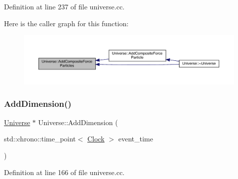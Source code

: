 Definition at line 237 of file universe.\+cc.

Here is the caller graph for this function\+:
\nopagebreak
\begin{figure}[H]
\begin{center}
\leavevmode
\includegraphics[width=350pt]{class_universe_a23d74e377203fca7cb74e0ffee7244b6_icgraph}
\end{center}
\end{figure}
\mbox{\label{class_universe_a6326158c47bf3f7fe9297299a9b5b7b7}} 
\subsubsection{\texorpdfstring{Add\+Dimension()}{AddDimension()}}
{\footnotesize\ttfamily \hyperlink{class_universe}{Universe} $\ast$ Universe\+::\+Add\+Dimension (\begin{DoxyParamCaption}\item[{std\+::chrono\+::time\+\_\+point$<$ \hyperlink{universe_8h_a0ef8d951d1ca5ab3cfaf7ab4c7a6fd80}{Clock} $>$}]{event\+\_\+time }\end{DoxyParamCaption})}



Definition at line 166 of file universe.\+cc.

